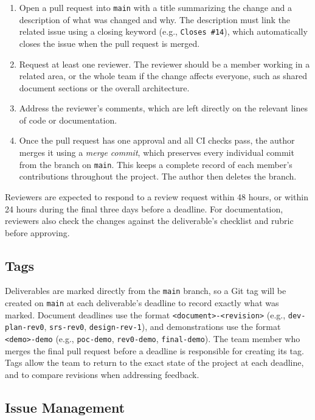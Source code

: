 \documentclass{article}
\begin{document}
\begin{enumerate}
  \item Open a pull request into \texttt{main} with a title summarizing the change and a description of what was changed and why. The description must link the related issue using a closing keyword (e.g., \texttt{Closes \#14}), which automatically closes the issue when the pull request is merged.
  \item Request at least one reviewer. The reviewer should be a member working in a related area, or the whole team if the change affects everyone, such as shared document sections or the overall architecture.
  \item Address the reviewer's comments, which are left directly on the relevant lines of code or documentation.
  \item Once the pull request has one approval and all CI checks pass, the author merges it using a \textit{merge commit}, which preserves every individual commit from the branch on \texttt{main}. This keeps a complete record of each member's contributions throughout the project. The author then deletes the branch.
\end{enumerate}

Reviewers are expected to respond to a review request within 48 hours, or within 24 hours during the final three days before a deadline. 
For documentation, reviewers also check the changes against the deliverable's checklist and rubric before approving.

\subsection{Tags}

Deliverables are marked directly from the \texttt{main} branch, so a Git tag will be created on \texttt{main} at each deliverable's deadline to record exactly what was marked. 
Document deadlines use the format \texttt{<document>-<revision>} (e.g., \texttt{dev-plan-rev0}, \texttt{srs-rev0}, \texttt{design-rev-1}), and demonstrations use the format \texttt{<demo>-demo} (e.g., \texttt{poc-demo}, \texttt{rev0-demo}, \texttt{final-demo}). 
The team member who merges the final pull request before a deadline is responsible for creating its tag. 
Tags allow the team to return to the exact state of the project at each deadline, and to compare revisions when addressing feedback.

\subsection{Issue Management}
\end{document}
